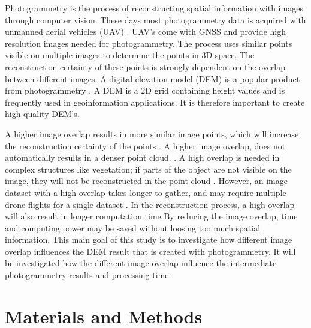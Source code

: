 \documentclass{isprs} %
\begin{document}
Photogrammetry is the process of reconstructing spatial information with images through computer vision. 
These days most photogrammetry data is acquired with unmanned aerial vehicles (UAV) \citep{UAVAreMoreUsed}. 
UAV's come with GNSS and provide high resolution images needed for photogrammetry.
The process uses similar points visible on multiple images to determine the points in 3D space.
The reconstruction certainty of these points is strongly dependent on the overlap between different images. 
A digital elevation model (DEM) is a popular product from photogrammetry \citep{DemIncrease1}.
A DEM is a 2D grid containing height values and is frequently used in geoinformation applications.
It is therefore important to create high quality DEM's.

A higher image overlap results in more similar image points, which will increase the reconstruction certainty of the points \citep{MoreOverMoreAcc}.
A higher image overlap, does not automatically results in a denser point cloud. \citep{EffectofUABimgcamover}. 
A high overlap is needed in complex structures like vegetation; if parts of the object are not visible on the image, they will not be reconstructed in the point cloud \citep{AccessingImageOverlap}.
However, an image dataset with a high overlap takes longer to gather, and may require multiple drone flights for a single dataset \citep{uavpop}.
In the reconstruction process, a high overlap will also result in longer computation time \citep{AccessingImageOverlap}
By reducing the image overlap, time and computing power may be saved without loosing too much spatial information.
This main goal of this study is to investigate how different image overlap influences the DEM result that is created with photogrammetry.
It will be investigated how the different image overlap influence the intermediate photogrammetry results and processing time.





\section{Materials and Methods}
\end{document}

